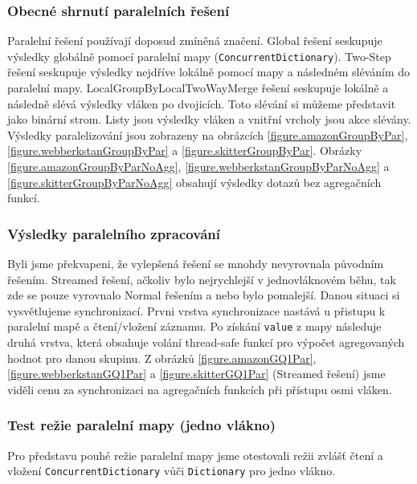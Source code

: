 \subsubsection{Obecné shrnutí paralelních řešení}

Paralelní řešení používají doposud zmíněná značení.
Global řešení seskupuje výsledky globálně pomocí paralelní mapy (\verb+ConcurrentDictionary+).
Two-Step řešení seskupuje výsledky nejdříve lokálně pomocí mapy a následném sléváním do paralelní mapy.
LocalGroupByLocalTwoWayMerge řešení seskupuje lokálně a následně slévá výsledky vláken po dvojicích. 
Toto slévání si můžeme představit jako binární strom. Listy jsou výsledky vláken a vnitřní vrcholy jsou akce slévány.
Výsledky paralelizování jsou zobrazeny na obrázcích \ref{figure.amazonGroupByPar}, \ref{figure.webberkstanGroupByPar} a \ref{figure.skitterGroupByPar}.
Obrázky \ref{figure.amazonGroupByParNoAgg}, \ref{figure.webberkstanGroupByParNoAgg} a \ref{figure.skitterGroupByParNoAgg} obsahují výsledky dotazů bez agregačních funkcí.

\subsubsection{Výsledky paralelního zpracování}

Byli jsme překvapeni, že vylepšená řešení se mnohdy nevyrovnala původním řešením.
Streamed řešení, ačkoliv bylo nejrychlejší v jednovláknovém běhu, tak zde se pouze vyrovnalo Normal řešením a nebo bylo pomalejší.
Danou situaci si vysvětlujeme synchronizací. 
Prvni vrstva synchronizace nastává u přistupu k paralelní mapě a čtení/vložení záznamu.
Po získání \verb+value+ z mapy následuje druhá vrstva, která obsahuje volání thread-safe funkcí pro výpočet agregovaných hodnot pro danou skupinu.
Z obrázků \ref{figure.amazonGQ1Par}, \ref{figure.webberkstanGQ1Par} a \ref{figure.skitterGQ1Par} (Streamed řešení) jsme viděli cenu za synchronizaci na agregačních funkcích při přístupu osmi vláken.

\subsubsection{Test režie paralelní mapy (jedno vlákno)}

Pro představu pouhé režie paralelní mapy jsme otestovali režii zvlášť čtení a vložení \verb+ConcurrentDictionary+ vůči \verb+Dictionary+ pro jedno vlákno.

